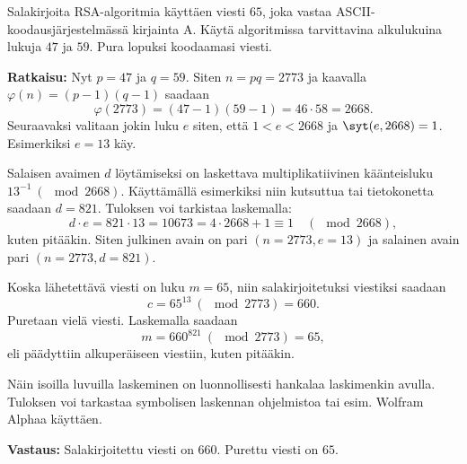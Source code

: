 \begin{esimerkki}
Salakirjoita RSA-algoritmia käyttäen viesti $65$, joka vastaa ASCII-koodausjärjestelmässä kirjainta A. Käytä algoritmissa tarvittavina alkulukuina lukuja $47$ ja $59$. Pura lopuksi koodaamasi viesti.

{\bf Ratkaisu:} 
Nyt $p = 47$ ja $q = 59$. Siten $n=pq=2773$ ja kaavalla $\varphi(n)=(p-1)(q-1)$ saadaan
\[
\varphi(2773)=(47-1)(59-1)=46\cdot 58 =2668.
\]
Seuraavaksi valitaan jokin luku $e$ siten, että $1<e<2668$ ja $\syt(e,2668)=1$. Esimerkiksi $e=13$ käy.

Salaisen avaimen $d$ löytämiseksi on laskettava multiplikatiivinen käänteisluku $13^{-1}\ (\mod 2668)$. Käyttämällä esimerkiksi niin kutsuttua  tai tietokonetta saadaan $d=821$. Tuloksen voi tarkistaa laskemalla:
\[
d \cdot e = 821 \cdot 13 = 10673 = 4\cdot 2668 + 1 \equiv 1 \quad (\mod 2668),
\]
kuten pitääkin. Siten julkinen avain on pari $(n=2773, e=13)$ ja salainen avain pari $(n=2773, d=821)$.

Koska lähetettävä viesti on luku $m=65$, niin salakirjoitetuksi viestiksi saadaan
\[
c= 65^{13}\ (\mod  2773) = 660.
\]
Puretaan vielä viesti. Laskemalla saadaan
\[
m=660^{821}\ (\mod  2773) = 65,
\]
eli päädyttiin alkuperäiseen viestiin, kuten pitääkin.

Näin isoilla luvuilla laskeminen on luonnollisesti hankalaa laskimenkin avulla. Tuloksen voi tarkastaa symbolisen laskennan ohjelmistoa tai esim. Wolfram Alphaa käyttäen. 

{\bf Vastaus:} Salakirjoitettu viesti on $660$. Purettu viesti on $65$.
\end{esimerkki}



\Harjoitustehtavat


